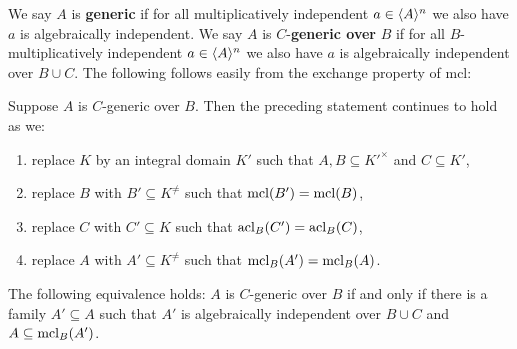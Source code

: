 \noindent We say \( A \) is {\bf generic} if for all multiplicatively independent $a \in \langle A \rangle^n$ we also have $a$ is algebraically independent.
We say $A$ is \(C\)-\textbf{generic over} \(B\) if  for all $B$-multiplicatively independent $a \in \langle A \rangle^n$ we also have $a$ is algebraically independent over $B \cup C$. The following follows easily from the exchange property of $\text{mcl}$:








\begin{lem} \label{GenericRobust}
Suppose $A$ is $C$-generic over $B$. Then the preceding statement continues to hold as we:
\begin{enumerate}
\item replace $K$ by an integral domain $K'$ such that $A, B \subseteq {K'}^\times$ and $C \subseteq K'$,
\item replace $B$ with $B' \subseteq K^\neq$ such that $\mathrm{mcl}(B') = \mathrm{mcl}(B)$,
\item replace $C$ with $C' \subseteq K$ such that $\mathrm{acl}_B(C') =\mathrm{acl}_B(C)$,
\item replace $A$ with $A'\subseteq K^\neq$ such that $\mathrm{mcl}_B(A') = \mathrm{mcl}_B(A)$.
\end{enumerate}
\end{lem}
\begin{comment}
\begin{proof}
Suppose $A$ is $C$-generic over $B$. Then (1), (2), (3) are clear from the definition. For (4), we can arrange that $K$ is a field, $A$ and $B$ are groups, and $A' =  \mcl_B(A)$. 
%
Suppose $a' \in (A')^n$ is multiplicatively independent over $B$. 
%
As $A' =  \mcl_B(A)$, for some $k$ we have $(a')^k$ is in $\la A \cup B \ra = AB$. 
%
Hence, $(a')^k = (a_1b_1, \ldots, a_n b_n)$. By exchange property of $\mcl_B$, $(a_1, \ldots, a_n)$ remains multiplicatively independent over $B$, and hence algebraically independent over $B\cup C$.
%
By exchange property of $\acl_{B\cup C}$, $(a')^k = (a_1b_1, \ldots, a_nb_n)$ remains algebraically independent over $B \cup C$.
%
Therefore, $a'$ is also algebraically independent over $B\cup C$, which is the desired conclusion.
\end{proof}
\end{comment}


\begin{cor} \label{Equiv1}
The following equivalence holds: \(A\) is \(C\)-generic over \(B\) if and only if there is a family \( A' \subseteq A\) such that $A'$ is algebraically independent over $B\cup C$ and  \( A \subseteq \mathrm{mcl}_B(A')  \).
\end{cor}

